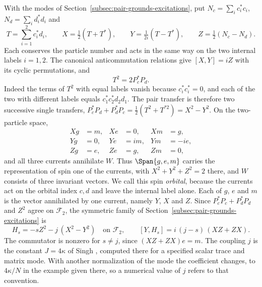 With the modes of Section~\ref{subsec:pair-grounds-excitations}, put $N_c=\sum_ic_i^*c_i$, $N_d=\sum_id_i^*d_i$ and
\begin{equation}
 T=\sum_{i=1}^2c_i^*d_i,\qquad X=\tfrac12(T+T^*),\qquad Y=\tfrac1{2i}(T-T^*),\qquad Z=\tfrac12(N_c-N_d).
 \label{eq:pair-currents}
\end{equation}
Each conserves the particle number and acts in the same way on the two internal labels $i=1,2$. The canonical anticommutation relations give $[X,Y]=iZ$ with its cyclic permutations, and
\begin{equation}
 T^2=2P_c^*P_d .
 \label{eq:pair-currents-square}
\end{equation}
Indeed the terms of $T^2$ with equal labels vanish because $c_i^*c_i^*=0$, and each of the two with different labels equals $c_1^*c_2^*d_2d_1$. The pair transfer is therefore two successive single transfers, $P_c^*P_d+P_d^*P_c=\tfrac12(T^2+T^{*2})=X^2-Y^2$. On the two-particle space,
\begin{equation}
 \begin{aligned}
 Xg&=m, & Xe&=0, & Xm&=g,\\
 Yg&=0, & Ye&=im, & Ym&=-ie,\\
 Zg&=e, & Ze&=g, & Zm&=0,
 \end{aligned}
 \label{eq:pair-currents-action}
\end{equation}
and all three currents annihilate $W$. Thus $\Span\{g,e,m\}$ carries the representation of spin one of the currents, with $X^2+Y^2+Z^2=2$ there, and $W$ consists of three invariant vectors. We call this spin \emph{orbital}, because the currents act on the orbital index $c,d$ and leave the internal label alone. Each of $g$, $e$ and $m$ is the vector annihilated by one current, namely $Y$, $X$ and $Z$. Since $P_c^*P_c+P_d^*P_d$ and $Z^2$ agree on $\mathcal F_2$, the symmetric family of Section~\ref{subsec:pair-grounds-excitations} is
\begin{equation}
 H_s=-sZ^2-j\,(X^2-Y^2)\quad\text{on }\mathcal F_2,\qquad
 [Y,H_s]=i\,(j-s)\,(XZ+ZX).
 \label{eq:pair-currents-hamiltonian}
\end{equation}
The commutator is nonzero for $s\ne j$, since $(XZ+ZX)e=m$. The coupling $j$ is the constant $J=4\kappa$ of Singh \cite[Eq.~(3.11)]{Singh2026PairTransfer}, computed there for a specified scalar trace and matrix mode. With another normalization of the mode the coefficient changes, to $4\kappa/N$ in the example given there, so a numerical value of $j$ refers to that convention.

